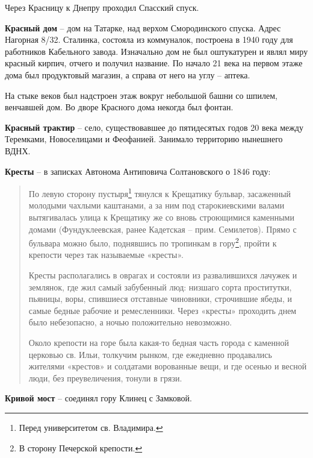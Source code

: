 Через Красницу к Днепру проходил Спасский спуск.\\

\medskip

\textbf{Красный дом} – дом на Татарке, над верхом Смородинского спуска. Адрес Нагорная 8/32. Сталинка, состояла из коммуналок, построена в 1940 году для работников Кабельного завода. Изначально дом не был оштукатурен и являл миру красный кирпич, отчего и получил название. По начало 21 века на первом этаже дома был продуктовый магазин, а справа от него на углу – аптека.

На стыке веков был надстроен этаж вокруг небольшой башни со шпилем, венчавшей дом. Во дворе Красного дома некогда был фонтан.\\    

\medskip

\textbf{Красный трактир} – село, существовавшее до пятидесятых годов 20 века между Теремками, Новоселицами и Феофанией. Занимало территорию нынешнего ВДНХ.\\


\medskip

\textbf{Кресты} – в записках Автонома Антиповича Солтановского о 1846 году:

\begin{quotation}
По левую сторону пустыря\footnote{Перед университетом св. Владимира.} тянулся к Крещатику бульвар, засаженный молодыми чахлыми каштанами, а за ним под старокиевскими валами вытягивалась улица к Крещатику же со вновь строющимися каменными домами (Фундуклеевская, ранее Кадетская – прим. Семилетов). Прямо с бульвара можно было, поднявшись по тропинкам в гору\footnote{В сторону Печерской крепости.}, пройти к крепости через так называемые «кресты».

Кресты располагались в оврагах и состояли из развалившихся лачужек и землянок, где жил самый забубенный люд: низшаго сорта проститутки, пьяницы, воры, спившиеся отставные чиновники, строчившие ябеды, и самые бедные рабочие и ремесленники. Через «кресты» проходить днем было небезопасно, а ночью положительно невозможно.

Около крепости на горе была какая-то бедная часть города с каменной церковью св. Ильи, толкучим рынком, где ежедневно продавались жителями «крестов» и солдатами ворованные вещи, и где осенью и весной люди, без преувеличения, тонули в грязи.
\end{quotation}


\medskip

\textbf{Кривой мост} – соединял гору Клинец с Замковой.\\

